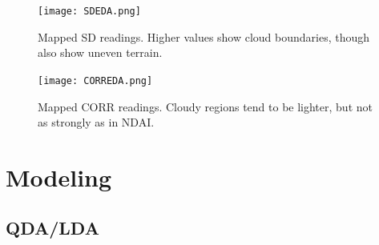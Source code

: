 \documentclass{article}\usepackage[]{graphicx}\usepackage[]{color}
\begin{document}
\begin{figure}[H]
\texttt{[image: SDEDA.png]}
\caption{Mapped SD readings. Higher values show cloud boundaries, though also show uneven terrain.}
\end{figure}

\begin{figure}[H]
\texttt{[image: CORREDA.png]}
\caption{Mapped CORR readings. Cloudy regions tend to be lighter, but not as strongly as in NDAI.}
\end{figure}

\section{Modeling}

\subsection{QDA/LDA}
\end{document}
